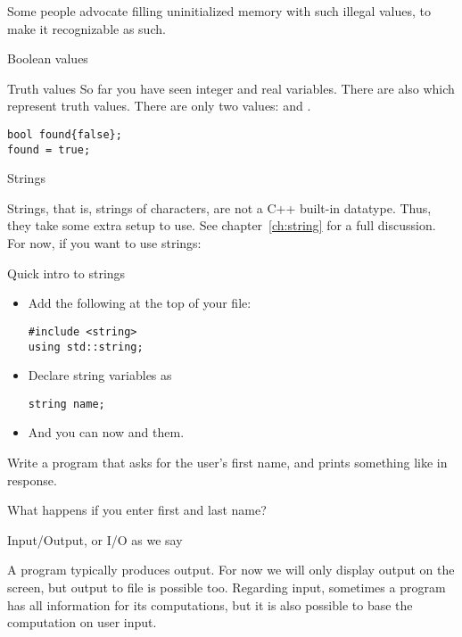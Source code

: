 Some people advocate filling uninitialized memory with such illegal
values, to make it recognizable as such.

 {Boolean values}

\begin{block}{Truth values}
  \label{sl:bool-var}
  So far you have seen integer and real variables. There are also
   which represent truth values. There are
  only two values:  and .
\begin{lstlisting}
bool found{false};
found = true;
\end{lstlisting}
\end{block}

 {Strings}

Strings, that is, strings of characters, are not a C++ built-in
datatype. Thus, they take some extra setup to use.
See chapter~\ref{ch:string} for a full discussion.
For now, if you
want to use strings:

\begin{block}{Quick intro to strings}
  \label{sl:quick-string}
  \begin{itemize}
  \item Add the following at the top of your file:
\begin{lstlisting}
#include <string>
using std::string;
\end{lstlisting}
\item Declare string variables as
\begin{lstlisting}
string name;
\end{lstlisting}
\item And you can now  and  them.
  \end{itemize}
\end{block}

\begin{exercise}
  \label{ex:ask-for-name}
  Write a program that asks for the user's first name, and prints
  something like  in response.

  What happens if you enter first and last name?
\end{exercise}

 {Input/Output, or I/O as we say}
\label{sec:io}

A program typically produces output. For now we will only display
output on the screen, but output to file is possible too.  Regarding
input, sometimes a program has all information for its computations,
but it is also possible to base the computation on user input.

